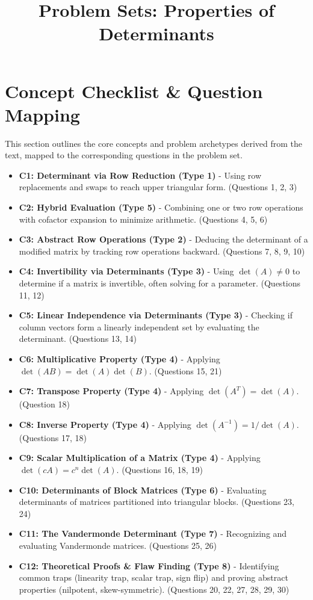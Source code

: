 \documentclass[11pt]{article}
\title{Problem Sets: Properties of Determinants}
\author{}
\date{}
\begin{document}
\maketitle

\tableofcontents
\newpage

\section{Concept Checklist \& Question Mapping}
This section outlines the core concepts and problem archetypes derived from the text, mapped to the corresponding questions in the problem set.

\begin{itemize}
    \item \textbf{C1: Determinant via Row Reduction (Type 1)} - Using row replacements and swaps to reach upper triangular form. (Questions 1, 2, 3)
    \item \textbf{C2: Hybrid Evaluation (Type 5)} - Combining one or two row operations with cofactor expansion to minimize arithmetic. (Questions 4, 5, 6)
    \item \textbf{C3: Abstract Row Operations (Type 2)} - Deducing the determinant of a modified matrix by tracking row operations backward. (Questions 7, 8, 9, 10)
    \item \textbf{C4: Invertibility via Determinants (Type 3)} - Using $\det(A) \neq 0$ to determine if a matrix is invertible, often solving for a parameter. (Questions 11, 12)
    \item \textbf{C5: Linear Independence via Determinants (Type 3)} - Checking if column vectors form a linearly independent set by evaluating the determinant. (Questions 13, 14)
    \item \textbf{C6: Multiplicative Property (Type 4)} - Applying $\det(AB) = \det(A)\det(B)$. (Questions 15, 21)
    \item \textbf{C7: Transpose Property (Type 4)} - Applying $\det(A^T) = \det(A)$. (Question 18)
    \item \textbf{C8: Inverse Property (Type 4)} - Applying $\det(A^{-1}) = 1/\det(A)$. (Questions 17, 18)
    \item \textbf{C9: Scalar Multiplication of a Matrix (Type 4)} - Applying $\det(cA) = c^n \det(A)$. (Questions 16, 18, 19)
    \item \textbf{C10: Determinants of Block Matrices (Type 6)} - Evaluating determinants of matrices partitioned into triangular blocks. (Questions 23, 24)
    \item \textbf{C11: The Vandermonde Determinant (Type 7)} - Recognizing and evaluating Vandermonde matrices. (Questions 25, 26)
    \item \textbf{C12: Theoretical Proofs \& Flaw Finding (Type 8)} - Identifying common traps (linearity trap, scalar trap, sign flip) and proving abstract properties (nilpotent, skew-symmetric). (Questions 20, 22, 27, 28, 29, 30)
\end{itemize}
\end{document}
